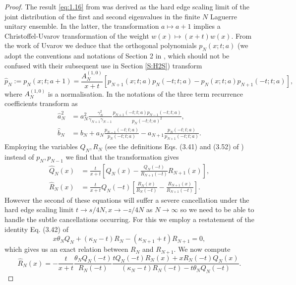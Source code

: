 \documentclass[10pt,reqno]{amsart}
\theoremstyle{plain}
\theoremstyle{definition}
\theoremstyle{remark}
\begin{document}
\begin{proof}
The result \eqref{eq:1.16} from \cite{FW_2007} was derived as the hard edge scaling limit of the joint distribution of the first
and second eigenvalues in the finite $ N $ Laguerre unitary ensemble.  In the latter, the transformation $ a \mapsto a+1 $ 
implies a Christoffel-Uvarov transformation of the weight $ w(x) \mapsto (x+t)w(x) $. 
From the work of Uvarov \cite{Uv_1969} we deduce that the orthogonal polynomials $ p_N(x;t;a) $ 
(we adopt the conventions and notations of Section 2 
in \cite{FW_2007}, which should not be confused with their subsequent use in Section \ref{S:H2S}) transform
\begin{equation}
  \hat{p}_N := p_N(x;t;a+1) = \frac{A^{(1,0)}_N}{x+t}\left[ p_{N+1}(x;t;a)p_{N}(-t;t;a)-p_{N}(x;t;a)p_{N+1}(-t;t;a) \right] ,
\end{equation}
where $ A^{(1,0)}_N $ is a normalisation. In the notations of \cite{FW_2007} the three term recurrence coefficients 
transform as
\begin{align}
  \hat{a}^2_{N} & = a^2_{N}\frac{\gamma_{N}^2}{\gamma_{N+1}\gamma_{N-1}}\frac{p_{N+1}(-t;t;a)p_{N-1}(-t;t;a)}{p_{N}(-t;t;a)^2} ,
\\
  \hat{b}_{N} & = b_{N}+a_{N}\frac{p_{N-1}(-t;t;a)}{p_{N}(-t;t;a)}-a_{N+1}\frac{p_{N}(-t;t;a)}{p_{N+1}(-t;t;a)} .
\end{align}
Employing the variables $ Q_N, R_N $ (see the definitions Eqs. (3.41) and (3.52) of \cite{FW_2007}) 
instead of $ p_N, p_{N-1} $ we find that the transformation gives
\begin{align}
  \hat{Q}_N(x) & = \frac{t}{x+t}\left[ Q_N(x)-\frac{Q_N(-t)}{R_{N+1}(-t)}R_{N+1}(x) \right] ,
\\
  \hat{R}_N(x) & = \frac{t}{x+t}Q_N(-t)\left[ \frac{R_{N}(x)}{R_{N}(-t)}-\frac{R_{N+1}(x)}{R_{N+1}(-t)} \right] .
\end{align}
However the second of these equations will suffer a severe cancellation under the hard edge scaling limit
$ t \to s/4N, x \to -z/4N $ as $ N \to \infty $
so we need to be able to handle the subtle cancellations occurring. For this we employ a restatement of the
identity Eq. (3.42) of \cite{FW_2007}
\begin{equation}
  x \theta_N Q_N+(\kappa_N-t)R_N-(\kappa_{N+1}+t)R_{N+1} = 0 ,
\end{equation}  
which gives us an exact relation between $ R_N $ and $ R_{N+1} $. 
We now compute
\begin{equation}
 \hat{R}_N(x) = -\frac{t}{x+t}\frac{\theta_NQ_N(-t)}{R_N(-t)}\frac{tQ_N(-t)R_N(x)+xR_N(-t)Q_N(x)}{(\kappa_N-t)R_N(-t)-t\theta_NQ_N(-t)} .

\end{equation}
\end{proof}
\end{document}
